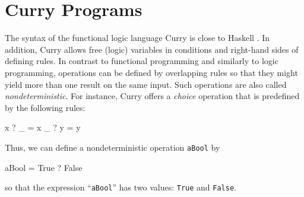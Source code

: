 \documentclass{llncs}
\newcommand{\code}[1]{\mbox{\small\texttt{#1}}}
\newcommand{\ccode}[1]{``\code{#1}''}
\begin{document}
\section{Curry Programs}
\label{sec:Curry}

The syntax of the functional logic language Curry \cite{Hanus06Curry}
is close to Haskell \cite{PeytonJones03Haskell}.
In addition, Curry allows free (logic)
variables in conditions and right-hand sides of defining rules.
In contrast to functional programming and similarly to logic programming,
operations can be defined by overlapping rules so that
they might yield more than one result on the same input.
Such operations are also called \emph{nondeterministic}.
For instance, Curry offers a \emph{choice} operation that is predefined by
the following rules:
%
\begin{curry}
  x ? _ = x
  _ ? y = y
\end{curry}
%
Thus, we can define a nondeterministic operation \code{aBool} by
\label{ex:aBool}
%
\begin{curry}
  aBool = True ? False
\end{curry}
%
so that the expression \ccode{aBool} has two values:
\code{True} and \code{False}.
\end{document}
